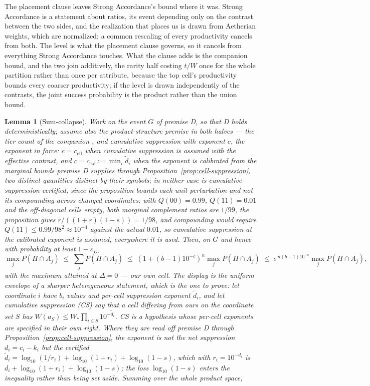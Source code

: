 \documentclass[11pt]{article}
\newtheorem{lemma}{Lemma}
\theoremstyle{definition}
\begin{document}
\noindent The placement clause leaves Strong Accordance's bound where it was. Strong Accordance is a statement about ratios, its event depending only on the contrast between the two sides, and the realization that places us is drawn from Aetherian weights, which are normalized; a common rescaling of every productivity cancels from both. The level is what the placement clause governs, so it cancels from everything Strong Accordance touches. What the clause adds is the companion bound, and the two join additively, the rarity half costing $t/W$ once for the whole partition rather than once per attribute, because the top cell's productivity bounds every coarser productivity; if the level is drawn independently of the contrasts, the joint success probability is the product rather than the union bound.


\begin{lemma}[Sum-collapse]
\label{lem:collapse}
Work on the event $G$ of premise D, so that D holds deterministically; assume also the product-structure premise in both halves --- the tier count of the companion \cite{Nexus}, and cumulative suppression with exponent $c$, the exponent in force: $c = c_{\mathrm{eff}}$ when cumulative suppression is assumed with the effective contrast, and $c = c_{\mathrm{cal}} := \min_i \tilde d_i$ when the exponent is calibrated from the marginal bounds premise D supplies through Proposition~\ref{prop:cell-suppression}, two distinct quantities distinct by their symbols; in neither case is cumulative suppression certified, since the proposition bounds each unit perturbation and not its compounding across changed coordinates: with $Q(00) = 0.99$, $Q(11) = 0.01$ and the off-diagonal cells empty, both marginal complement ratios are $1/99$, the proposition gives $r/((1+r)(1-s)) = 1/98$, and compounding would require $Q(11) \le 0.99/98^{2} \approx 10^{-4}$ against the actual $0.01$, so cumulative suppression at the calibrated exponent is assumed, everywhere it is used. Then, on $G$ and hence with probability at least $1 - \varepsilon_D$,
\begin{equation}
\label{eq:sum-collapse}
\max_j P(H \cap A_j) \;\le\; \sum_j P(H \cap A_j) \;\le\; \left(1 + (b-1)10^{-c}\right)^{n} \max_j P(H \cap A_j)
\;\le\; e^{\,n(b-1)10^{-c}} \max_j P(H \cap A_j),
\end{equation}
with the maximum attained at $\Delta = 0$ --- our own cell. The display is the uniform envelope of a sharper heterogeneous statement, which is the one to prove: let coordinate $i$ have $b_i$ values and per-cell suppression exponent $\tilde d_i$, and let \emph{cumulative suppression} (CS) say that a cell differing from ours on the coordinate set $S$ has $W(a_S) \le W_\ast \prod_{i \in S} 10^{-\tilde d_i}$. CS is a hypothesis whose per-cell exponents are specified in their own right. Where they are read off premise D through Proposition~\ref{prop:cell-suppression}, the exponent is not the net suppression $d_i = c_i - k_i$ but the certified $\tilde d_i = \log_{10}(1/r_i) + \log_{10}(1 + r_i) + \log_{10}(1 - s)$, which with $r_i = 10^{-d_i}$ is $d_i + \log_{10}(1 + r_i) + \log_{10}(1 - s)$; the loss $\log_{10}(1 - s)$ enters the inequality rather than being set aside. Summing over the whole product space,

\end{lemma}
\end{document}

